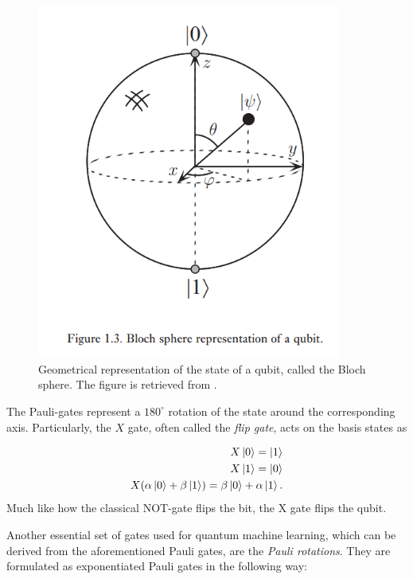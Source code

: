\begin{figure}[htp]
    \centering
    \includegraphics[width=10cm]{latex/figures/Blochsphere.PNG}
    \caption{Geometrical representation of the state of a qubit, called the Bloch sphere. The figure is retrieved from \citet{NielsenQuantum}.}
    \label{fig:blochsphere}
\end{figure}

The Pauli-gates represent a $180^{\circ}$ rotation of the state around the corresponding axis. Particularly, the $X$ gate, often called the \emph{flip gate}, acts on the basis states as

\begin{equation}
\begin{aligned}
    X\ket{0} = \ket{1} \\
    X\ket{1} = \ket{0} \\
    X(\alpha \ket{0} + \beta\ket{1}) = \beta \ket{0} + \alpha\ket{1}.
\end{aligned}    
\end{equation}
Much like how the classical NOT-gate flips the bit, the X gate flips the qubit.

Another essential set of gates used for quantum machine learning, which can be derived from the aforementioned Pauli gates, are the \emph{Pauli rotations}. They are formulated as exponentiated Pauli gates in the following way:

